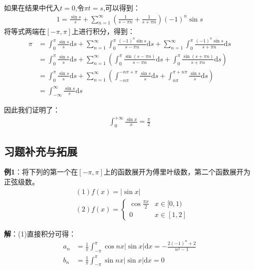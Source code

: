 \documentclass{ctexart}
\let\oldtextbf\textbf
\renewcommand{\textbf}[1]{\textcolor{brown!50!red}{\oldtextbf{#1}}}
\begin{document}
\begin{tcolorbox}[
    colback=bac1,     %
    colframe=fra1,   %
    coltitle=white!80,    
    coltext=tex1,%
    title=进一步拓展,
    fonttitle=\bfseries,        %
arc=2mm,                     %
breakable
]
如果在结果中代入$t=0$,令$\pi t=s$,可以得到：
\begin{align*}
    1=\frac{\sin s}{s}+\sum_{n=1}^\infty(\frac{1}{s-\pi n}+\frac{1}{s+\pi n})(-1)^n\sin s
\end{align*}
将等式两端在$[-\pi,\pi]$上进行积分，得到：
\begin{align*}
\pi&=\int_{0}^\pi\frac{\sin s}{s}\mathrm{d}s+\sum_{n=1}^\infty
\int_{0}^\pi\frac{(-1)^n\sin s}{s-\pi n}\mathrm{d}s +\sum_{n=1}^\infty\int_{0}^\pi\frac{(-1)^n\sin s}{s+\pi n}\mathrm{d}s 
\\&=\int_{0}^\pi \frac{\sin s}{s}\mathrm{d}s+\sum_{n=1}^\infty \left(\int_0^\pi
\frac{\sin(s-\pi n) }{s-\pi n}\mathrm{d}s+ \int_0^\pi
\frac{\sin(s+\pi n) }{s+\pi n}\mathrm{d}s \right)\\
&=\int_{0}^\pi \frac{\sin s}{s}\mathrm{d}s+\sum_{n=1}^\infty \left(\int_{-n\pi}^{-n\pi+\pi}
\frac{\sin s}{s}\mathrm{d}s+ \int_{n\pi}^{\pi+n\pi}
\frac{\sin s }{s}\mathrm{d}s \right)\\
&=\int_{-\infty}^\infty \frac{\sin s}{s}\mathrm{d}s
\end{align*}

因此我们证明了：
\begin{align*}
    \int_0^{+\infty}\frac{\sin x}{x}=\frac{\pi}{2}
\end{align*}
\end{tcolorbox}

\subsection{习题补充与拓展}
\textbf{\color{brown!50!red}例1}：将下列的第一个在$[-\pi,\pi]$上的函数展开为傅里叶级数，第二个函数展开为正弦级数。
\begin{align*}
    &(1)f(x)=|\sin x|\\
    &(2) f(x)=\begin{cases}
        \cos\frac{\pi x}{2}& x\in[0,1)\\
        0 & x\in[1,2]
    \end{cases}
\end{align*}

\textbf{\color{brown!50!red}解}：(1)直接积分可得：
\begin{align*}
a_n&=\frac{1}{\pi}\int_{-\pi}^\pi \cos nx|\sin x|\mathrm{d}x=-\frac{2(-1)^n+2}{n^2-1}\\
b_n&=\frac{1}{\pi}\int_{-\pi}^\pi \sin nx|\sin x|\mathrm{d}x=0   
\end{align*}
\end{document}
